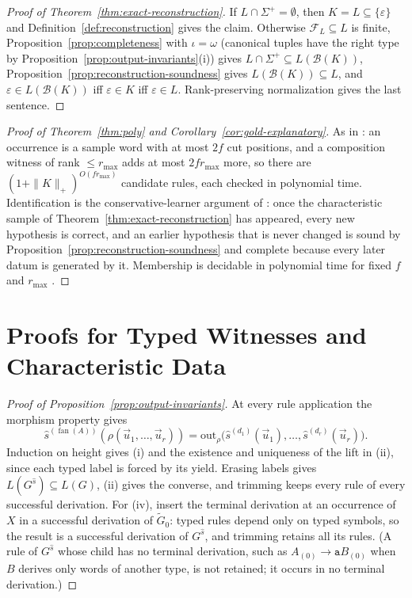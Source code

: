 \documentclass[11pt]{article}
\numberwithin{equation}{section}
\theoremstyle{plain}
\theoremstyle{definition}
\theoremstyle{remark}
\newcommand{\out}{\mathrm{out}}
\newcommand{\tuple}[1]{\vec{#1}}
\newcommand{\eps}{\varepsilon}
\newcommand{\fan}{\operatorname{fan}}
\theoremstyle{plain}
\begin{document}
\begin{proof}[Proof of Theorem~\ref{thm:exact-reconstruction}]
If $L\cap\Sigma^+=\emptyset$, then $K=L\subseteq\{\eps\}$ and
Definition~\ref{def:reconstruction} gives the claim.  Otherwise $\mathcal F_L\subseteq L$
is finite, Proposition~\ref{prop:completeness} with $\iota=\omega$ (canonical tuples have
the right type by Proposition~\ref{prop:output-invariants}(i)) gives
$L\cap\Sigma^+\subseteq L(\mathcal B(K))$, Proposition~\ref{prop:reconstruction-soundness}
gives $L(\mathcal B(K))\subseteq L$, and $\eps\in L(\mathcal B(K))$ iff $\eps\in K$ iff
$\eps\in L$.  Rank-preserving normalization gives the last sentence.
\end{proof}

\begin{proof}[Proof of Theorem~\ref{thm:poly} and Corollary~\ref{cor:gold-explanatory}]
As in \cite[Lemma~6]{Yoshinaka2011}: an occurrence is a sample word with at most
$2f$ cut positions, and a composition witness of rank $\le r_{\max}$ adds at most
$2fr_{\max}$ more, so there are $(1+\|K\|_+)^{O(fr_{\max})}$ candidate rules, each
checked in polynomial time.  Identification is the conservative-learner argument
of \cite[Corollary~1 and Theorem~1]{Yoshinaka2011}: once the characteristic
sample of Theorem~\ref{thm:exact-reconstruction} has appeared, every new
hypothesis is correct, and an earlier hypothesis that is never changed is
sound by Proposition~\ref{prop:reconstruction-soundness} and complete because
every later datum is generated by it.  Membership is decidable in polynomial
time for fixed $f$ and $r_{\max}$ \cite[Proposition~4]{Yoshinaka2011}.
\end{proof}

\section{Proofs for Typed Witnesses and Characteristic Data}
\label{app:typed-witness-aux-proofs}

\begin{proof}[Proof of Proposition~\ref{prop:output-invariants}]
At every rule application the morphism property gives
\[
 \widehat s^{(\fan(A))}(\rho(\tuple u_1,\ldots,\tuple u_r))=
 \out_\rho\bigl(\widehat s^{(d_1)}(\tuple u_1),\ldots,\widehat s^{(d_r)}(\tuple u_r)\bigr).
\]  Induction on height gives (i) and the existence and uniqueness
of the lift in (ii), since each typed label is forced by its yield.  Erasing labels gives
$L(G^{\widehat s})\subseteq L(G)$, (ii) gives the converse, and trimming keeps every rule
of every successful derivation.  For (iv), insert the terminal derivation at an occurrence
of $X$ in a successful derivation of $\widetilde G_0$: typed rules depend only on typed
symbols, so the result is a successful derivation of $G^{\widehat s}$, and trimming retains
all its rules.  (A rule of $G^{\widehat s}$ whose child has no terminal derivation, such as
$A_{(0)}\to\mathtt aB_{(0)}$ when $B$ derives only words of another type, is not retained;
it occurs in no terminal derivation.)
\end{proof}
\end{document}
